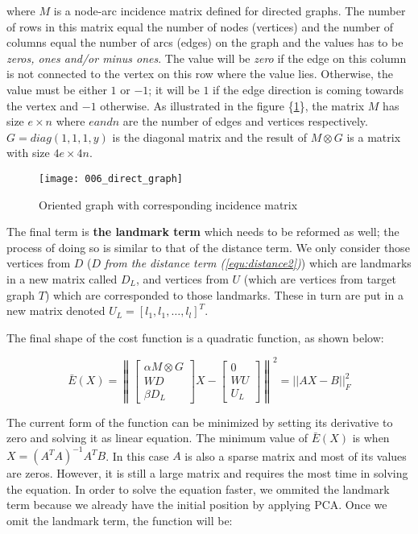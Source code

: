 \documentclass[../structure.tex]{subfiles}
\begin{document}
where $M$ is a node-arc incidence matrix defined for directed graphs. The number of rows in this matrix equal the number of nodes (vertices) and the number of columns equal the number of arcs (edges) on the graph and the values has to be \textit{zeros, ones and/or minus ones}. The value will be \textit{zero} if the edge on this column is not connected to the vertex on this row where the value lies. Otherwise, the value must be either $1$ or $-1$; it will be $1$ if the edge direction is coming towards the vertex and $-1$ otherwise. As illustrated in the figure \{\ref{fig:directed_graph}\}, the matrix $M$ has size $e\times n$ where $e and n$ are the number of edges and vertices respectively. $G = diag(1,1,1,y)$ is the diagonal matrix and the result of $M \otimes G$ is a matrix with size $4e \times 4n$.

\begin{figure}[h!]
\centering
\texttt{[image: 006\_direct\_graph]}
\captionsetup{justification=centering}
\caption{Oriented graph with corresponding incidence matrix  \cite{Wikipedia2010}}
\label{fig:directed_graph}
\end{figure}

The final term is \textbf{the landmark term} which needs to be reformed as well; the process of doing so is similar to that of the distance term. We only consider those vertices from $D$ ($D$ \textit{from the distance term (\ref{equ:distance2})}) which are landmarks in a new matrix called $D_{L}$, and vertices from $U$ (which are vertices from target graph $T$) which are corresponded to those landmarks. These in turn are put in a new matrix denoted $U_{L} = [l_{1}, l_{1}, \dots,l_{l}]^T$.

The final shape of the cost function is a quadratic function, as shown below:

\begin{equation}
\bar{E}(X) = \left\|
\begin{bmatrix}
\alpha M \otimes G \\ WD \\ \beta D_{L}
\end{bmatrix}
X -
\begin{bmatrix}
0 \\ WU \\ U_{L}
\end{bmatrix}
\right\| ^2 = ||AX - B||_{F}^2
\end{equation}

The current form of the function can be minimized by setting its derivative to zero and solving it as linear equation. The minimum value of $\bar{E}(X)$ is when $X = (A^T A)^{-1} A^T B$. In this case $A$ is also a sparse matrix and most of its values are zeros. However, it is still a large matrix and requires the most time in solving the equation. In order to solve the equation faster, we ommited the landmark term because we already have the initial position by applying PCA. Once we omit the landmark term, the function will be:
\end{document}
